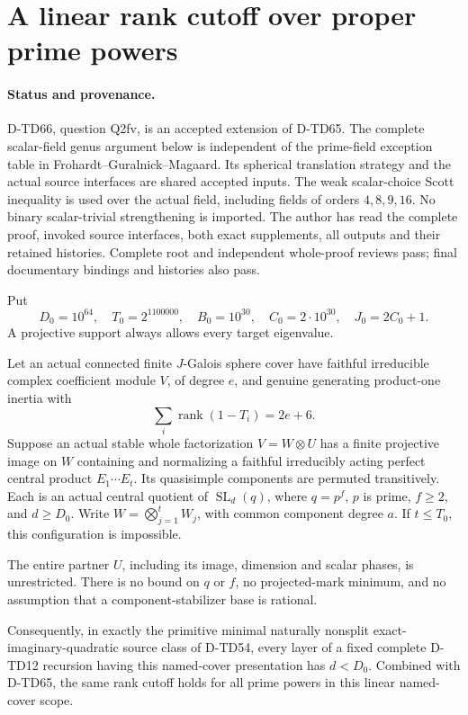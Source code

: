 \section{A linear rank cutoff over proper prime powers}
\label{sec:proper-prime-power-linear-cutoff}

\paragraph{Status and provenance.}
D-TD66, question Q2fv, is an accepted extension of D-TD65.
The complete scalar-field genus argument below is independent of
the prime-field exception table in Frohardt--Guralnick--Magaard.
Its spherical translation strategy and the actual source interfaces
are shared accepted inputs. The weak scalar-choice Scott inequality
is used over the actual field, including fields of orders
\(4,8,9,16\). No binary scalar-trivial strengthening is imported.
The author has read the complete proof, invoked source interfaces,
both exact supplements, all outputs and their retained histories.
Complete root and independent whole-proof reviews pass;
final documentary bindings and histories also pass.

Put
\[
 D_0=10^{64},\quad T_0=2^{1100000},\quad B_0=10^{30},
 \quad C_0=2\cdot10^{30},\quad J_0=2C_0+1.
 \tag{QPL.1}
\]
A projective support always allows every target eigenvalue.

\begin{theorem}[D-TD66]
Let an actual connected finite \(J\)-Galois sphere cover have
faithful irreducible complex coefficient module \(V\), of degree
\(e\), and genuine generating product-one inertia with
\[
                  \sum_i\operatorname{rank}(1-T_i)=2e+6.
 \tag{QPL.2}
\]
Suppose an actual stable whole factorization \(V=W\otimes U\)
has a finite projective image on \(W\) containing and normalizing
a faithful irreducibly acting perfect central product
\(E_1\cdots E_t\). Its quasisimple components are permuted
transitively. Each is an actual central quotient of
\(\operatorname{SL}_d(q)\), where \(q=p^f\), \(p\) is prime,
\(f\ge2\), and \(d\ge D_0\). Write
\(W=\bigotimes_{j=1}^tW_j\), with common component degree \(a\).
If \(t\le T_0\), this configuration is impossible.

The entire partner \(U\), including its image, dimension and
scalar phases, is unrestricted. There is no bound on \(q\) or
\(f\), no projected-mark minimum, and no assumption that a
component-stabilizer base is rational.

Consequently, in exactly the primitive minimal naturally
nonsplit exact-imaginary-quadratic source class of D-TD54,
every layer of a fixed complete D-TD12 recursion having this
named-cover presentation has \(d<D_0\). Combined with D-TD65,
the same rank cutoff holds for all prime powers in this
linear named-cover scope.
\end{theorem}

